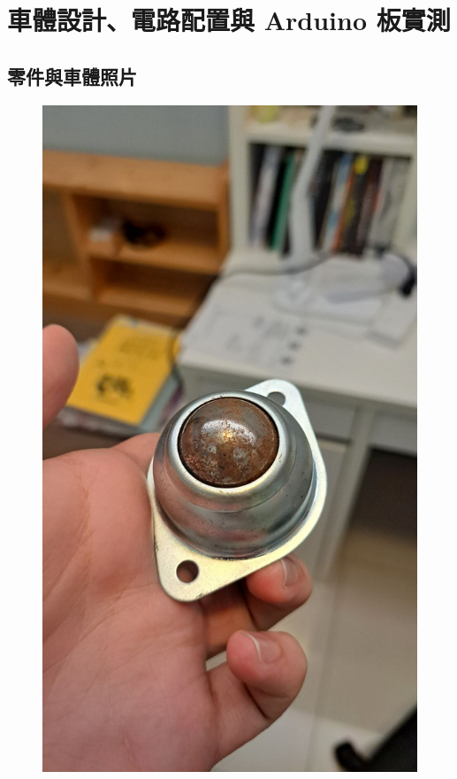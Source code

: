 \documentclass[a4paper,12pt]{./article}
\begin{document}
\section{車體設計、電路配置與 Arduino 板實測}

\subsection{零件與車體照片}
\begin{center}\begin{figure}[H]\centering
\hfill
\begin{minipage}[t]{./0.45\textwidth}
\centering
\includegraphics[width=\textwidth]{./photos/a.jpg}

\end{minipage}
\end{figure}
\end{center}
\end{document}
